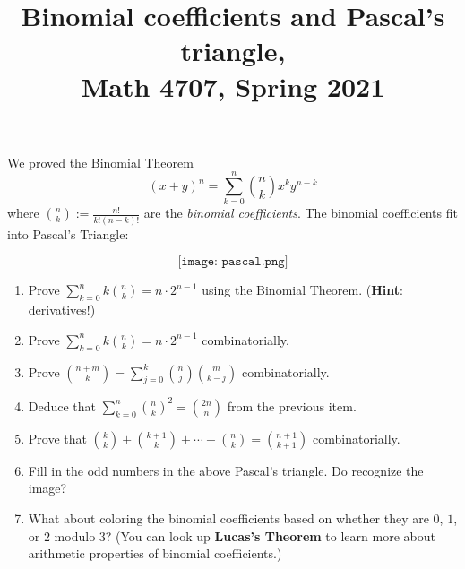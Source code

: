 \documentclass[11pt]{article}
\title{Binomial coefficients and Pascal's triangle, \\Math 4707, Spring 2021}
\date{}
\begin{document}
\maketitle

\thispagestyle{empty}

\vspace{-0.5in}

We proved the Binomial Theorem
\[ (x+y)^n = \sum_{k=0}^{n} \binom{n}{k}x^k y^{n-k}\]
where $\binom{n}{k} := \frac{n!}{k!(n-k)!}$ are the \emph{binomial coefficients}. The binomial coefficients fit into Pascal's Triangle:

\[ \texttt{[image: pascal.png]}\]

\medskip


\begin{enumerate}

\item Prove $\sum_{k=0}^{n} k \binom{n}{k} = n \cdot 2^{n-1}$ using the Binomial Theorem. ({\bf Hint}: derivatives!)
\item Prove $\sum_{k=0}^{n} k \binom{n}{k} = n \cdot 2^{n-1}$ combinatorially.
\item Prove $\binom{n+m}{k} = \sum_{j=0}^{k} \binom{n}{j}\binom{m}{k-j}$ combinatorially.
\item Deduce that $\sum_{k=0}^{n} \binom{n}{k}^{2} = \binom{2n}{n}$ from the previous item.
\item Prove that $\binom{k}{k} + \binom{k+1}{k} + \cdots + \binom{n}{k}=\binom{n+1}{k+1}$ combinatorially.

\medskip \medskip

\item Fill in the odd numbers in the above Pascal's triangle. Do recognize the image?

\item What about coloring the binomial coefficients based on whether they are $0$, $1$, or $2$ modulo $3$? (You can look up {\bf Lucas's Theorem} to learn more about arithmetic properties of binomial coefficients.)

\end{enumerate}
\end{document}
